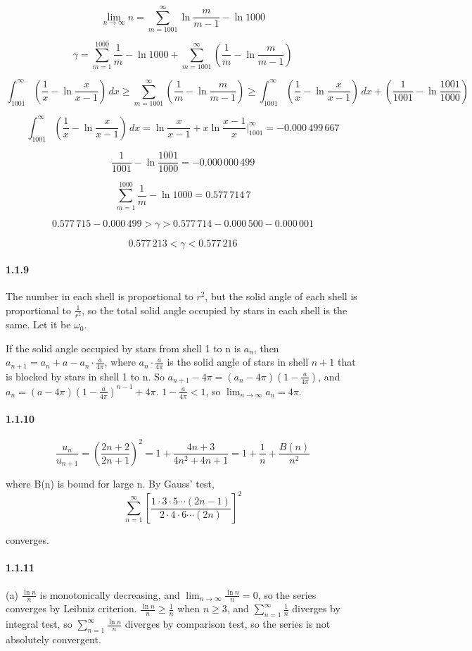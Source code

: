 \documentclass[a4paper]{article}
\begin{document}
\[\lim_{n\to\infty}n=\sum_{m=1001}^\infty\ln \frac{m}{m-1}-\ln 1000\]

\[\gamma=\sum_{m=1}^{1000}\frac{1}{m}-\ln{1000}+\sum_{m=1001}^\infty(\frac{1}{m}-\ln\frac{m}{m-1})\]

\[\int_{1001}^\infty(\frac{1}{x}-\ln\frac{x}{x-1})\,dx\geq\sum_{m=1001}^\infty(\frac{1}{m}-\ln\frac{m}{m-1})\geq \int_{1001}^\infty(\frac{1}{x}-\ln\frac{x}{x-1})\,dx+(\frac{1}{1001}-\ln\frac{1001}{1000})\]

\[\int_{1001}^\infty(\frac{1}{x}-\ln\frac{x}{x-1})\,dx=\ln\frac{x}{x-1}+x\ln\frac{x-1}{x}\Big |_{1001}^\infty=-0.000\,499\,667\]

\[\frac{1}{1001}-\ln\frac{1001}{1000}=-0.000\,000\,499\]

\[\sum_{m=1}^{1000}\frac{1}{m}-\ln1000=0.577\,714\,7\]

\[0.577\,715-0.000\,499>\gamma>0.577\,714-0.000\,500-0.000\,001\]

\[0.577\,213<\gamma<0.577\,216\]

\paragraph{1.1.9}
The number in each shell is proportional to $r^2$, but the solid angle of each shell is proportional to $\frac{1}{r^2}$, so the total solid angle occupied by stars in each shell is the same. Let it be $\omega_0$.

If the solid angle occupied by stars from shell 1 to n is $a_n$, then $a_{n+1}=a_n+a-a_n\cdot \frac{a}{4\pi}$, where $a_n\cdot \frac{a}{4\pi}$ is the solid angle of stars in shell $n+1$ that is blocked by stars in shell 1 to n. So $a_{n+1}-4\pi=(a_n-4\pi)(1-\frac{a}{4\pi})$, and $a_n=(a-4\pi)(1-\frac{a}{4\pi})^{n-1}+4\pi$. $1-\frac{a}{4\pi}<1$, so $\lim_{n\to\infty}a_n=4\pi$.

\paragraph{1.1.10}
\[\frac{u_n}{u_{n+1}}=\left (\frac{2n+2}{2n+1} \right)^2=1+\frac{4n+3}{4n^2+4n+1}=1+\frac{1}{n}+\frac{B(n)}{n^2}\] 

where B(n) is bound for large n. By Gauss' test, \[\sum_{n=1}^\infty\left[ \frac{1\cdot3\cdot5\cdots(2n-1)}{2\cdot4\cdot6\cdots(2n)} \right]^2\] 

converges.

\paragraph{1.1.11}
(a) $\frac{\ln n}{n}$ is monotonically decreasing, and $\lim_{n\to\infty}\frac{\ln n}{n}=0$, so the series converges by  Leibniz criterion. $\frac{\ln n}{n}\geq \frac{1}{n}$ when $n\geq 3$, and $\sum_{n=1}^\infty\frac{1}{n}$ diverges by integral test, so $\sum_{n=1}^\infty\frac{\ln n}{n}$ diverges by comparison test, so the series is not absolutely convergent.
\medskip
\end{document}
